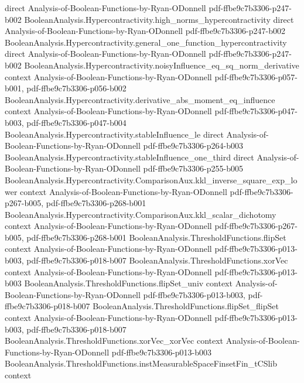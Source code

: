 \begin{lemma}
  {direct}
  {Analysis-of-Boolean-Functions-by-Ryan-ODonnell}
  {pdf-ffbe9c7b3306-p247-b002}
\proofstep
  {BooleanAnalysis.Hypercontractivity.high_norms_hypercontractivity}
  {direct}
  {Analysis-of-Boolean-Functions-by-Ryan-ODonnell}
  {pdf-ffbe9c7b3306-p247-b002}
\proofstep
  {BooleanAnalysis.Hypercontractivity.general_one_function_hypercontractivity}
  {direct}
  {Analysis-of-Boolean-Functions-by-Ryan-ODonnell}
  {pdf-ffbe9c7b3306-p247-b002}
\proofstep
  {BooleanAnalysis.Hypercontractivity.noisyInfluence_eq_sq_norm_derivative}
  {context}
  {Analysis-of-Boolean-Functions-by-Ryan-ODonnell}
  {pdf-ffbe9c7b3306-p057-b001,
    pdf-ffbe9c7b3306-p056-b002}
\proofstep
  {BooleanAnalysis.Hypercontractivity.derivative_abs_moment_eq_influence}
  {context}
  {Analysis-of-Boolean-Functions-by-Ryan-ODonnell}
  {pdf-ffbe9c7b3306-p047-b003,
    pdf-ffbe9c7b3306-p047-b004}
\proofstep
  {BooleanAnalysis.Hypercontractivity.stableInfluence_le}
  {direct}
  {Analysis-of-Boolean-Functions-by-Ryan-ODonnell}
  {pdf-ffbe9c7b3306-p264-b003}
\proofstep
  {BooleanAnalysis.Hypercontractivity.stableInfluence_one_third}
  {direct}
  {Analysis-of-Boolean-Functions-by-Ryan-ODonnell}
  {pdf-ffbe9c7b3306-p255-b005}
\proofstep
  {BooleanAnalysis.Hypercontractivity.ComparisonAux.kkl_inverse_square_exp_lower}
  {context}
  {Analysis-of-Boolean-Functions-by-Ryan-ODonnell}
  {pdf-ffbe9c7b3306-p267-b005,
    pdf-ffbe9c7b3306-p268-b001}
\proofstep
  {BooleanAnalysis.Hypercontractivity.ComparisonAux.kkl_scalar_dichotomy}
  {context}
  {Analysis-of-Boolean-Functions-by-Ryan-ODonnell}
  {pdf-ffbe9c7b3306-p267-b005,
    pdf-ffbe9c7b3306-p268-b001}
\proofstep
  {BooleanAnalysis.ThresholdFunctions.flipSet}
  {context}
  {Analysis-of-Boolean-Functions-by-Ryan-ODonnell}
  {pdf-ffbe9c7b3306-p013-b003,
    pdf-ffbe9c7b3306-p018-b007}
\proofstep
  {BooleanAnalysis.ThresholdFunctions.xorVec}
  {context}
  {Analysis-of-Boolean-Functions-by-Ryan-ODonnell}
  {pdf-ffbe9c7b3306-p013-b003}
\proofstep
  {BooleanAnalysis.ThresholdFunctions.flipSet_univ}
  {context}
  {Analysis-of-Boolean-Functions-by-Ryan-ODonnell}
  {pdf-ffbe9c7b3306-p013-b003,
    pdf-ffbe9c7b3306-p018-b007}
\proofstep
  {BooleanAnalysis.ThresholdFunctions.flipSet_flipSet}
  {context}
  {Analysis-of-Boolean-Functions-by-Ryan-ODonnell}
  {pdf-ffbe9c7b3306-p013-b003,
    pdf-ffbe9c7b3306-p018-b007}
\proofstep
  {BooleanAnalysis.ThresholdFunctions.xorVec_xorVec}
  {context}
  {Analysis-of-Boolean-Functions-by-Ryan-ODonnell}
  {pdf-ffbe9c7b3306-p013-b003}
\proofstep
  {BooleanAnalysis.ThresholdFunctions.instMeasurableSpaceFinsetFin_tCSlib}
  {context}

\end{lemma}
